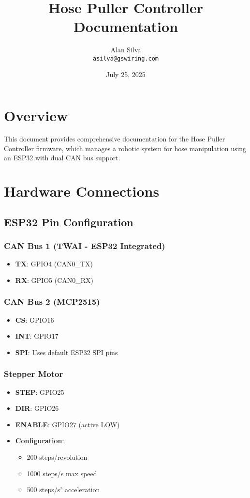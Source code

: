 \documentclass{article}
\title{Hose Puller Controller Documentation}
\author{Alan Silva \\ \texttt{asilva@gswiring.com}}
\date{July 25, 2025}
\begin{document}
\maketitle

\section{Overview}
This document provides comprehensive documentation for the Hose Puller Controller firmware, which manages a robotic system for hose manipulation using an ESP32 with dual CAN bus support.

\section{Hardware Connections}

\subsection{ESP32 Pin Configuration}

\subsubsection{CAN Bus 1 (TWAI - ESP32 Integrated)}
\begin{itemize}
    \item \textbf{TX}: GPIO4 (CAN0\_TX)
    \item \textbf{RX}: GPIO5 (CAN0\_RX)
\end{itemize}

\subsubsection{CAN Bus 2 (MCP2515)}
\begin{itemize}
    \item \textbf{CS}: GPIO16
    \item \textbf{INT}: GPIO17
    \item \textbf{SPI}: Uses default ESP32 SPI pins
\end{itemize}

\subsubsection{Stepper Motor}
\begin{itemize}
    \item \textbf{STEP}: GPIO25
    \item \textbf{DIR}: GPIO26
    \item \textbf{ENABLE}: GPIO27 (active LOW)
    \item \textbf{Configuration}: 
    \begin{itemize}
        \item 200 steps/revolution
        \item 1000 steps/s max speed
        \item 500 steps/s² acceleration
    \end{itemize}
\end{itemize}
\end{document}
